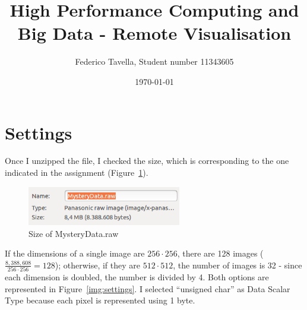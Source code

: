 \documentclass[a4paper]{article}
\title{High Performance Computing and Big Data - Remote Visualisation}
\author{Federico Tavella, Student number 11343605}
\date{\today}
\begin{document}
\maketitle

\section{Settings}

Once I unzipped the file, I checked the size, which is corresponding to the one indicated in the assignment (Figure~\ref{img:file_size}).

\begin{figure}[htbp]
\centering
\includegraphics[width=0.6\textwidth]{res/file_size.png}
\caption{Size of MysteryData.raw}
\label{img:file_size}
\end{figure}

If the dimensions of a single image are $256 \cdot 256$, there are 128 images ($\frac{8,388,608}{256 \cdot 256} = 128$); otherwise, if they are $512 \cdot 512$, the number of images is 32 - since each dimension is doubled, the number is divided by 4. Both options are represented in Figure~\ref{img:settings}.
I selected “unsigned char” as Data Scalar Type because each pixel is represented using 1 byte.
\end{document}
